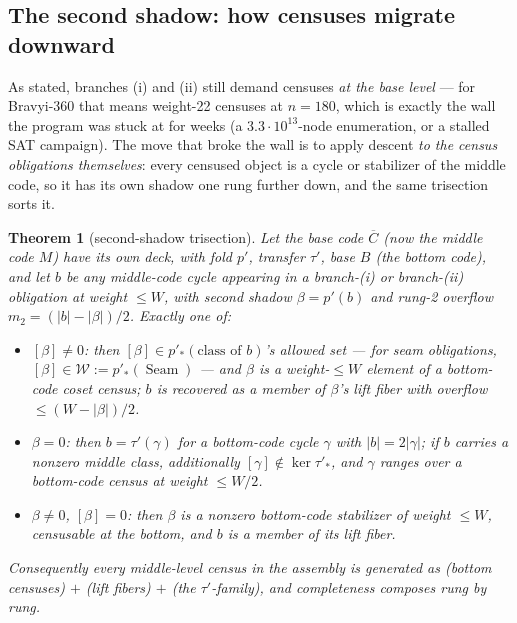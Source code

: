 \documentclass[11pt]{article}
\theoremstyle{plain}
\newtheorem{theorem}{Theorem}[section]
\theoremstyle{definition}
\theoremstyle{remark}
\newcommand{\Seam}{\operatorname{Seam}}
\newcommand{\wt}[1]{\lvert #1\rvert}
\newcommand{\ov}[1]{\overline{#1}}
\begin{document}
\subsection{The second shadow: how censuses migrate downward}
\label{sec:secondshadow}

As stated, branches (i) and (ii) still demand censuses \emph{at the base
level} --- for Bravyi-360 that means weight-22 censuses at $n = 180$,
which is exactly the wall the program was stuck at for weeks (a
$3.3\cdot 10^{13}$-node enumeration, or a stalled SAT campaign). The move
that broke the wall is to apply descent \emph{to the census obligations
themselves}: every censused object is a cycle or stabilizer of the middle
code, so it has its own shadow one rung further down, and the same
trisection sorts it.

\begin{theorem}[second-shadow trisection]\label{thm:secondshadow}
Let the base code $\ov C$ (now the \emph{middle} code $M$) have its own
deck, with fold $p'$, transfer $\tau'$, base $B$ (the \emph{bottom}
code), and let $b$ be any middle-code cycle appearing in a branch-(i) or
branch-(ii) obligation at weight $\leq W$, with second shadow $\beta =
p'(b)$ and rung-2 overflow $m_2 = (\wt b - \wt\beta)/2$. Exactly one of:
\begin{itemize}[leftmargin=2.2em]
\item[\emph{(A)}] $[\beta] \neq 0$: then $[\beta] \in p'_*(\text{class of
  } b)$'s allowed set --- for seam obligations, $[\beta] \in
  \mathcal{W} := p'_*(\Seam)$ --- and $\beta$ is a weight-$\leq W$
  element of a \emph{bottom-code} coset census; $b$ is recovered as a
  member of $\beta$'s lift fiber with overflow $\leq (W - \wt\beta)/2$.
\item[\emph{(B)}] $\beta = 0$: then $b = \tau'(\gamma)$ for a bottom-code
  cycle $\gamma$ with $\wt b = 2\wt\gamma$; if $b$ carries a nonzero
  middle class, additionally $[\gamma] \notin \ker \tau'_*$, and
  $\gamma$ ranges over a bottom-code census at weight $\leq W/2$.
\item[\emph{(C)}] $\beta \neq 0$, $[\beta] = 0$: then $\beta$ is a
  nonzero \emph{bottom-code stabilizer} of weight $\leq W$, censusable at
  the bottom, and $b$ is a member of its lift fiber.
\end{itemize}
Consequently every middle-level census in the assembly is
\emph{generated} as (bottom censuses) $+$ (lift fibers) $+$ (the
$\tau'$-family), and completeness composes rung by rung.
\end{theorem}
\end{document}
